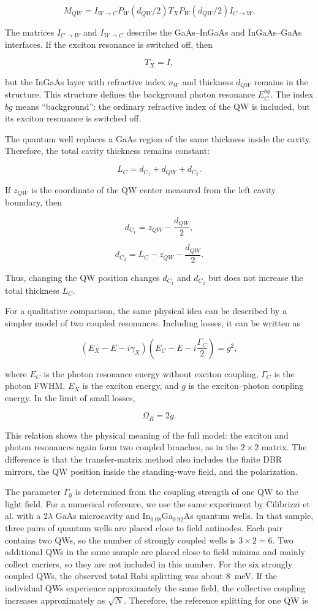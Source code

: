 \documentclass[12pt,a4paper]{article}
\begin{document}
\[
M_{QW}
=
I_{W\rightarrow C}
P_W(d_{QW}/2)
T_X
P_W(d_{QW}/2)
I_{C\rightarrow W}.
\]

The matrices $I_{C\rightarrow W}$ and $I_{W\rightarrow C}$ describe the GaAs--InGaAs and InGaAs--GaAs interfaces. If the exciton resonance is switched off, then

\[
T_X=I,
\]

but the InGaAs layer with refractive index $n_W$ and thickness $d_{QW}$ remains in the structure. This structure defines the background photon resonance $E_C^{bg}$. The index $bg$ means ``background'': the ordinary refractive index of the QW is included, but its exciton resonance is switched off.

The quantum well replaces a GaAs region of the same thickness inside the cavity. Therefore, the total cavity thickness remains constant:

\[
L_C=d_{C_1}+d_{QW}+d_{C_2}.
\]

If $z_{QW}$ is the coordinate of the QW center measured from the left cavity boundary, then

\[
d_{C_1}=z_{QW}-\frac{d_{QW}}{2},
\]

\[
d_{C_2}=L_C-z_{QW}-\frac{d_{QW}}{2}.
\]

Thus, changing the QW position changes $d_{C_1}$ and $d_{C_2}$ but does not increase the total thickness $L_C$.

For a qualitative comparison, the same physical idea can be described by a simpler model of two coupled resonances. Including losses, it can be written as

\[
\left(E_X-E-i\gamma_X\right)
\left(E_C-E-i\frac{\Gamma_C}{2}\right)
=g^2,
\]

where $E_C$ is the photon resonance energy without exciton coupling, $\Gamma_C$ is the photon FWHM, $E_X$ is the exciton energy, and $g$ is the exciton--photon coupling energy. In the limit of small losses,

\[
\Omega_R=2g.
\]

This relation shows the physical meaning of the full model: the exciton and photon resonances again form two coupled branches, as in the $2\times2$ matrix. The difference is that the transfer-matrix method also includes the finite DBR mirrors, the QW position inside the standing-wave field, and the polarization.

The parameter $\Gamma_0$ is determined from the coupling strength of one QW to the light field. For a numerical reference, we use the same experiment by Cilibrizzi et al. with a $2\lambda$ GaAs microcavity and In$_{0.08}$Ga$_{0.92}$As quantum wells. In that sample, three pairs of quantum wells are placed close to field antinodes. Each pair contains two QWs, so the number of strongly coupled wells is $3\times2=6$. Two additional QWs in the same sample are placed close to field minima and mainly collect carriers, so they are not included in this number. For the six strongly coupled QWs, the observed total Rabi splitting was about $8$~meV. If the individual QWs experience approximately the same field, the collective coupling increases approximately as $\sqrt{N}$. Therefore, the reference splitting for one QW is
\end{document}
